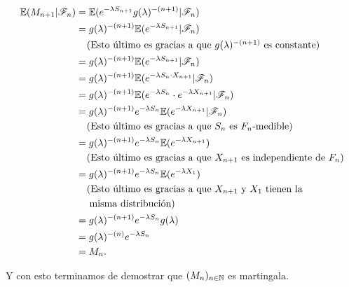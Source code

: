 \begin{itemize}
            \begin{align}
                \mathbb{E}(M_{n+1} | \mathscr{F}_n)      &=      \mathbb{E}(e^{-\lambda S_{n+1}}g(\lambda)^{-(n+1)}|\mathscr{F}_n)                                        \\
                                        &=      g(\lambda)^{-(n+1)}\mathbb{E}(e^{-\lambda S_{n+1}}|\mathscr{F}_n)                                        \\
                                        &\;\;\;\;\mbox{(Esto último es gracias a que $g(\lambda)^{-(n+1)}$ es constante)}               \\
                                        &=      g(\lambda)^{-(n+1)}\mathbb{E}(e^{-\lambda S_{n+1}}|\mathscr{F}_n)                                        \\
                                        &=      g(\lambda)^{-(n+1)}\mathbb{E}(e^{-\lambda S_{n} \cdot X_{n+1}}|\mathscr{F}_n)                            \\
                                        &=      g(\lambda)^{-(n+1)}\mathbb{E}(e^{-\lambda S_{n}} \cdot e^{-\lambda X_{n+1}}|\mathscr{F}_n)               \\
                                        &=      g(\lambda)^{-(n+1)} e^{-\lambda S_{n}} \mathbb{E}(e^{-\lambda X_{n+1}}|\mathscr{F}_n)                    \\                                       
                                        &\;\;\;\;\mbox{(Esto último es gracias a que $S_n$ es $F_n$-medible)}                           \\
                                        &=      g(\lambda)^{-(n+1)} e^{-\lambda S_{n}} \mathbb{E}(e^{-\lambda X_{n+1}})                         \\
                                        &\;\;\;\;\mbox{(Esto último es gracias a que $X_{n+1}$ es independiente de $F_n$)}              \\
                                        &=      g(\lambda)^{-(n+1)} e^{-\lambda S_{n}} \mathbb{E}(e^{-\lambda X_{1}})                           \\
                                        &\;\;\;\;\mbox{(Esto último es gracias a que $X_{n+1}$ y $X_1$ tienen la}                       \\ 
                                        &\;\;\;\;\;\mbox{misma distribución)}   \\
                                        &=      g(\lambda)^{-(n+1)} e^{-\lambda S_{n}} g(\lambda)                                       \\
                                        &=      g(\lambda)^{-(n)} e^{-\lambda S_{n}}                                                    \\
                                        &=      M_n.
            \end{align}
    \end{itemize}
    
    Y con esto terminamos de demostrar que $(M_n)_{n \in \mathbb{N}}$ es martingala.